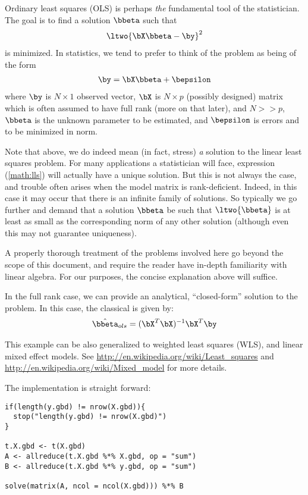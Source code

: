 Ordinary least squares (OLS)
is perhaps \emph{the} fundamental tool of the statistician. The goal is to
find a solution $\bbeta$ such that
\begin{align}
\ltwo{ \bX\bbeta - \by }^2 \label{math:lls}
\end{align}
is minimized. In statistics, we tend to prefer to think of the problem as
being of the form
\begin{align}
\by = \bX\bbeta + \bepsilon \label{math:statslls}
\end{align}
where $\by$ is $N\times 1$ observed vector,
$\bX$ is $N\times p$ (possibly designed) matrix which is often assumed to
have full rank (more on that later), and $N >> p$,
$\bbeta$ is the unknown parameter to be estimated,
and $\bepsilon$ is errors and to be minimized in norm.

Note that above, we do indeed mean (in fact, stress) \emph{a} solution
to the linear least squares problem. For many applications a statistician
will face, expression (\ref{math:lls}) will actually have a unique
solution. But this is not always the case, and trouble often arises when
the model matrix is rank-deficient. Indeed, in this case it may occur
that there is an infinite family of solutions. So typically we go further
and demand that a solution $\bbeta$ be such that $\ltwo{\bbeta}$ is at
least as small as the corresponding norm of any other solution (although
even this may not guarantee uniqueness).

A properly thorough treatment of the problems involved here go beyond the
scope of this document, and require the reader have in-depth familiarity
with linear algebra. For our purposes, the concise explanation above will
suffice.  



In the full rank case, we can provide an analytical, ``closed-form''
solution to the problem.  In this case, the classical
is given by:
\begin{align}
 \hat{\bbeta}_{ols} = (\bX^T\bX)^{-1}\bX^T\by \label{math:ols}
\end{align}
 
This example can be also generalized to weighted least squares (WLS),
and linear mixed effect models.
See \url{http://en.wikipedia.org/wiki/Least_squares} and
\url{http://en.wikipedia.org/wiki/Mixed_model} for more details.

The implementation is straight forward:
\begin{lstlisting}[language=rr,title=R Code]
if(length(y.gbd) != nrow(X.gbd)){
  stop("length(y.gbd) != nrow(X.gbd)")
}

t.X.gbd <- t(X.gbd)
A <- allreduce(t.X.gbd %*% X.gbd, op = "sum")
B <- allreduce(t.X.gbd %*% y.gbd, op = "sum")

solve(matrix(A, ncol = ncol(X.gbd))) %*% B
\end{lstlisting}


